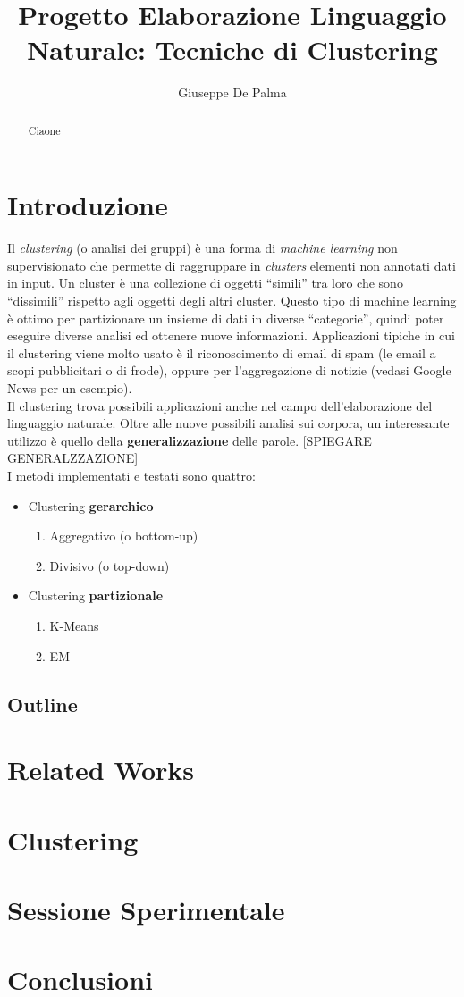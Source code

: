 \documentclass{llncs}
\author{Giuseppe De Palma}
\title{Progetto Elaborazione Linguaggio Naturale: Tecniche di Clustering}
\institute{Alma Mater Studiorum - Università di Bologna \\
	\email{giuseppe.depalma@studio.unibo.it}\\
	\email{Matricola: 854846}
}
\newcommand{\acapo}{\vspace{0.5\baselineskip}\\}
\begin{document}
    \maketitle
	
	\begin{abstract}
		Ciaone
	\end{abstract}
	   
	\section{Introduzione}
	Il \textit{clustering} (o analisi dei gruppi) è una forma di \textit{machine learning} non supervisionato che permette di raggruppare in \textit{clusters} elementi non annotati
	dati in input. Un cluster è una collezione di oggetti ``simili'' tra loro che sono ``dissimili'' rispetto agli oggetti degli altri cluster. Questo tipo di machine learning è
	ottimo per partizionare un insieme di dati in diverse ``categorie'', quindi poter eseguire diverse analisi ed ottenere nuove informazioni.
	Applicazioni tipiche in cui il clustering viene molto usato è il riconoscimento di email di spam (le email a scopi pubblicitari o di frode), oppure per l'aggregazione di notizie (vedasi Google News per un esempio).
	\acapo
	Il clustering trova possibili applicazioni anche nel campo dell'elaborazione del linguaggio naturale. Oltre alle nuove possibili analisi
	sui corpora, un interessante utilizzo è quello della \textbf{generalizzazione} delle parole.
	[SPIEGARE GENERALZZAZIONE]
	\acapo 
	I metodi implementati e testati sono quattro:
	\begin{itemize}
		\item Clustering \textbf{gerarchico}
		\begin{enumerate}
			\item Aggregativo (o bottom-up)
			\item Divisivo (o top-down)
		\end{enumerate}

		\item Clustering \textbf{partizionale}
		\begin{enumerate}
			\item K-Means
			\item EM
		\end{enumerate}
	\end{itemize}
    \subsection{Outline}
    \section{Related Works}
    \section{Clustering}
    \section{Sessione Sperimentale}
    \section{Conclusioni}
    
\end{document}
